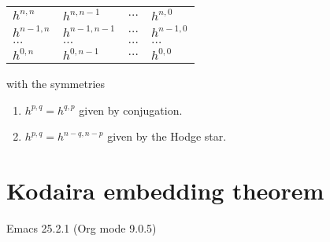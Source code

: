 \documentclass[11pt]{article}
\begin{document}
\begin{center}
\begin{tabular}{llll}
\(h^{n,n}\) & \(h^{n, n-1}\) & \(\dots\) & \(h^{n,0}\)\\
\(h^{n-1,n}\) & \(h^{n-1,n-1}\) & \(\dots\) & \(h^{n-1,0}\)\\
\(\dots\) & \(\dots\) & \(\dots\) & \(\dots\)\\
\(h^{0,n}\) & \(h^{0, n-1}\) & \(\dots\) & \(h^{0,0}\)\\
\end{tabular}
\end{center}

with the symmetries
\begin{enumerate}
\item \(h^{p,q} = h^{q,p}\) given by conjugation.
\item \(h^{p,q} =h^{n-q, n-p}\) given by the Hodge star.
\end{enumerate}


\section{Kodaira embedding theorem}
\label{sec:orgef4301b}
Emacs 25.2.1 (Org mode 9.0.5)
\end{document}
